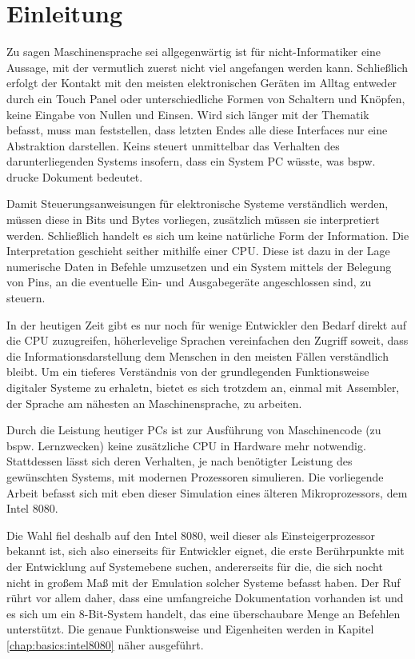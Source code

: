 \chapter{Einleitung}

Zu sagen Maschinensprache sei allgegenwärtig ist für nicht-Informatiker eine Aussage, mit der vermutlich zuerst nicht viel angefangen werden kann. Schließlich erfolgt der Kontakt mit den meisten elektronischen Geräten im Alltag entweder durch ein Touch Panel oder unterschiedliche Formen von Schaltern und Knöpfen, keine Eingabe von Nullen und Einsen. Wird sich länger mit der Thematik befasst, muss man feststellen, dass letzten Endes alle diese Interfaces nur eine Abstraktion darstellen. Keins steuert unmittelbar das Verhalten des darunterliegenden Systems insofern, dass ein System PC wüsste, was bspw. \glqq drucke Dokument\grqq{} bedeutet.

Damit Steuerungsanweisungen für elektronische Systeme verständlich werden, müssen diese in Bits und Bytes vorliegen, zusätzlich müssen sie interpretiert werden. Schließlich handelt es sich um keine natürliche Form der Information. Die Interpretation geschieht seither mithilfe einer \ac{CPU}. Diese ist dazu in der Lage numerische Daten in Befehle umzusetzen und ein System mittels der Belegung von Pins, an die eventuelle Ein- und Ausgabegeräte angeschlossen sind, zu steuern.

In der heutigen Zeit gibt es nur noch für wenige Entwickler den Bedarf direkt auf die \ac{CPU} zuzugreifen, höherlevelige Sprachen vereinfachen den Zugriff soweit, dass die Informationsdarstellung dem Menschen in den meisten Fällen verständlich bleibt. Um ein tieferes Verständnis von der grundlegenden Funktionsweise digitaler Systeme zu erhaletn, bietet es sich trotzdem an, einmal mit Assembler, der Sprache am nähesten an Maschinensprache, zu arbeiten.
\medskip

Durch die Leistung heutiger PCs ist zur Ausführung von Maschinencode (zu bspw. Lernzwecken) keine zusätzliche \ac{CPU} in Hardware mehr notwendig. Stattdessen lässt sich deren Verhalten, je nach benötigter Leistung des gewünschten Systems, mit modernen Prozessoren simulieren. Die vorliegende Arbeit befasst sich mit eben dieser Simulation eines älteren Mikroprozessors, dem Intel 8080.

Die Wahl fiel deshalb auf den Intel 8080, weil dieser als \glqq Einsteigerprozessor\grqq{} bekannt ist, sich also einerseits für Entwickler eignet, die erste Berührpunkte mit der Entwicklung auf Systemebene suchen, andererseits für die, die sich nocht nicht in großem Maß mit der Emulation solcher Systeme befasst haben. Der Ruf rührt vor allem daher, dass eine umfangreiche Dokumentation vorhanden ist und es sich um ein 8-Bit-System handelt, das eine überschaubare Menge an Befehlen unterstützt. Die genaue Funktionsweise und Eigenheiten werden in Kapitel \ref{chap:basics:intel8080} näher ausgeführt.

